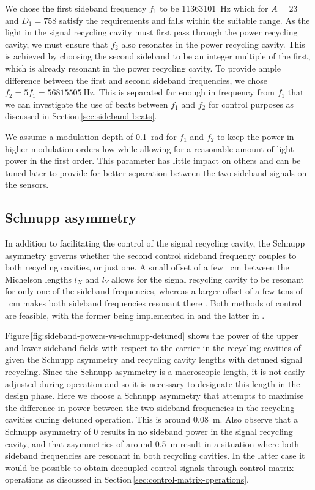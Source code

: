 We chose the first sideband frequency $f_1$ to be \SI{11363101}{\hertz} which for $A = 23$ and $D_{1} = 758$ satisfy the requirements and falls within the suitable range. As the light in the signal recycling cavity must first pass through the power recycling cavity, we must ensure that $f_2$ also resonates in the power recycling cavity. This is achieved by choosing the second sideband to be an integer multiple of the first, which is already resonant in the power recycling cavity. To provide ample difference between the first and second sideband frequencies, we chose $f_2 = 5f_1 = \SI{56815505}{\hertz}$. This is separated far enough in frequency from $f_1$ that we can investigate the use of beats between $f_1$ and $f_2$ for control purposes as discussed in Section\,\ref{sec:sideband-beats}.

We assume a modulation depth of \SI{0.1}{\radian} for $f_1$ and $f_2$ to keep the power in higher modulation orders low while allowing for a reasonable amount of light power in the first order. This parameter has little impact on others and can be tuned later to provide for better separation between the two sideband signals on the sensors.

\subsection{Schnupp asymmetry}
In addition to facilitating the control of the signal recycling cavity, the Schnupp asymmetry governs whether the second control sideband frequency couples to both recycling cavities, or just one. A small offset of a few \SI{}{\centi\meter} between the Michelson lengths $l_X$ and $l_Y$ allows for the signal recycling cavity to be resonant for only one of the sideband frequencies, whereas a larger offset of a few tens of \SI{}{\centi\meter} makes both sideband frequencies resonant there \cite{Vajente2008}. Both methods of control are feasible, with the former being implemented in \ALIGO{} \cite{Abbott2010} and the latter in \KAGRA{} \cite{kagra2013}.

Figure\,\ref{fig:sideband-powers-vs-schnupp-detuned} shows the power of the upper and lower sideband fields with respect to the carrier in the recycling cavities of \ETLF{} given the Schnupp asymmetry and recycling cavity lengths with detuned signal recycling. Since the Schnupp asymmetry is a macroscopic length, it is not easily adjusted during operation and so it is necessary to designate this length in the design phase. Here we choose a Schnupp asymmetry that attempts to maximise the difference in power between the two sideband frequencies in the recycling cavities during detuned operation. This is around \SI{0.08}{\meter}. Also observe that a Schnupp asymmetry of \num{0} results in no sideband power in the signal recycling cavity, and that asymmetries of around \SI{0.5}{\meter} result in a situation where both sideband frequencies are resonant in both recycling cavities. In the latter case it would be possible to obtain decoupled control signals through control matrix operations as discussed in Section\,\ref{sec:control-matrix-operations}.

